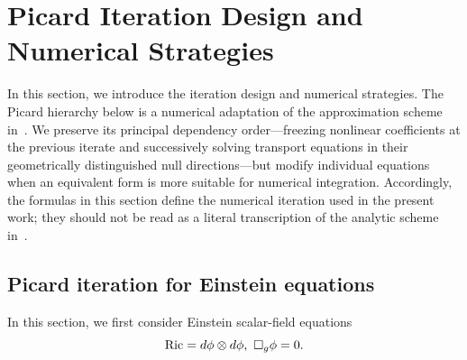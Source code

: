 

\section{Picard Iteration Design and Numerical Strategies}
In this section, we introduce the iteration design and numerical strategies.
The Picard hierarchy below is a numerical adaptation of the approximation
scheme in~\cite{wu-26}.  We preserve its principal dependency order---freezing
nonlinear coefficients at the previous iterate and successively solving
transport equations in their geometrically distinguished null directions---but
modify individual equations when an equivalent form is more suitable for
numerical integration.  Accordingly, the formulas in this section define the
numerical iteration used in the present work; they should not be read as a
literal transcription of the analytic scheme in~\cite{wu-26}.

\subsection{Picard iteration for Einstein equations}
In this section, we first consider Einstein scalar-field equations
\[\operatorname{Ric}=d\phi\otimes d\phi,\ \square_g\phi =0.\]

